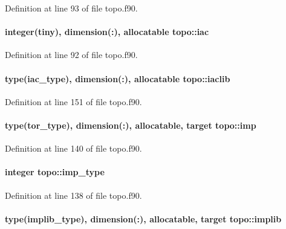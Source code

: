 Definition at line 93 of file topo.\-f90.

\hypertarget{classtopo_ae4a49e34cb36ac8f97b97dc0ed0dc467}{
\paragraph[{iac}]{\setlength{\rightskip}{0pt plus 5cm}integer(tiny), dimension(\-:), allocatable topo\-::iac}}\label{classtopo_ae4a49e34cb36ac8f97b97dc0ed0dc467}


Definition at line 92 of file topo.\-f90.

\hypertarget{classtopo_ac0d4a792e1df748bab4c64c116767f36}{
\paragraph[{iaclib}]{\setlength{\rightskip}{0pt plus 5cm}type({\bf iac\-\_\-type}), dimension(\-:), allocatable topo\-::iaclib}}\label{classtopo_ac0d4a792e1df748bab4c64c116767f36}


Definition at line 151 of file topo.\-f90.

\hypertarget{classtopo_ac57046f9ffb42c26a980df689e49fa21}{
\paragraph[{imp}]{\setlength{\rightskip}{0pt plus 5cm}type({\bf tor\-\_\-type}), dimension(\-:), allocatable, target topo\-::imp}}\label{classtopo_ac57046f9ffb42c26a980df689e49fa21}


Definition at line 140 of file topo.\-f90.

\hypertarget{classtopo_a3e704a6de4b91501a168a1bfa7971824}{
\paragraph[{imp\-\_\-type}]{\setlength{\rightskip}{0pt plus 5cm}integer topo\-::imp\-\_\-type}}\label{classtopo_a3e704a6de4b91501a168a1bfa7971824}


Definition at line 138 of file topo.\-f90.

\hypertarget{classtopo_a5137a466e7383aab3d7d0c1a25ba0a21}{
\paragraph[{implib}]{\setlength{\rightskip}{0pt plus 5cm}type({\bf implib\-\_\-type}), dimension(\-:), allocatable, target topo\-::implib}}\label{classtopo_a5137a466e7383aab3d7d0c1a25ba0a21}


